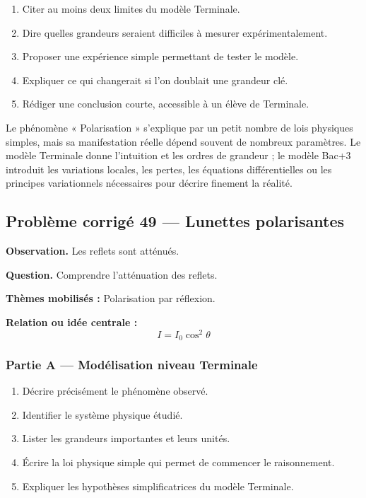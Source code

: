 \documentclass[11pt,a4paper]{article}
\begin{document}
\begin{enumerate}
  \item Citer au moins deux limites du modèle Terminale.
  \item Dire quelles grandeurs seraient difficiles à mesurer expérimentalement.
  \item Proposer une expérience simple permettant de tester le modèle.
  \item Expliquer ce qui changerait si l'on doublait une grandeur clé.
  \item Rédiger une conclusion courte, accessible à un élève de Terminale.
\end{enumerate}

\begin{corrigebox}
Le phénomène « Polarisation » s'explique par un petit nombre de lois physiques simples, mais sa manifestation réelle dépend souvent de nombreux paramètres. Le modèle Terminale donne l'intuition et les ordres de grandeur ; le modèle Bac+3 introduit les variations locales, les pertes, les équations différentielles ou les principes variationnels nécessaires pour décrire finement la réalité.
\end{corrigebox}

\subsection{Problème corrigé 49 — Lunettes polarisantes}

\begin{exercicebox}
\textbf{Observation.} Les reflets sont atténués.

\medskip
\textbf{Question.} Comprendre l'atténuation des reflets.

\medskip
\textbf{Thèmes mobilisés :} Polarisation par réflexion.

\medskip
\textbf{Relation ou idée centrale :}
\[
I=I_0\cos^2\theta
\]
\end{exercicebox}

\subsubsection*{Partie A — Modélisation niveau Terminale}

\begin{enumerate}
  \item Décrire précisément le phénomène observé.
  \item Identifier le système physique étudié.
  \item Lister les grandeurs importantes et leurs unités.
  \item Écrire la loi physique simple qui permet de commencer le raisonnement.
  \item Expliquer les hypothèses simplificatrices du modèle Terminale.
\end{enumerate}
\end{document}

